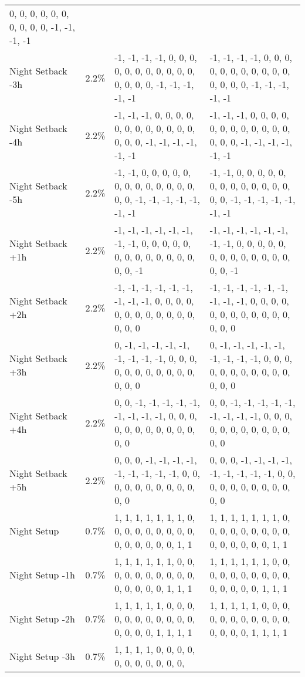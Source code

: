 \begin{longtable}[]{@{}llll@{}}
0, 0, 0, 0, 0, 0, 0, 0, 0, 0, -1, -1, -1, -1 \\
Night Setback -3h & 2.2\% & -1, -1, -1, -1, 0, 0, 0, 0, 0, 0, 0, 0, 0,
0, 0, 0, 0, 0, 0, -1, -1, -1, -1, -1 & -1, -1, -1, -1, 0, 0, 0, 0, 0, 0,
0, 0, 0, 0, 0, 0, 0, 0, 0, -1, -1, -1, -1, -1 \\
Night Setback -4h & 2.2\% & -1, -1, -1, 0, 0, 0, 0, 0, 0, 0, 0, 0, 0, 0,
0, 0, 0, 0, -1, -1, -1, -1, -1, -1 & -1, -1, -1, 0, 0, 0, 0, 0, 0, 0, 0,
0, 0, 0, 0, 0, 0, 0, -1, -1, -1, -1, -1, -1 \\
Night Setback -5h & 2.2\% & -1, -1, 0, 0, 0, 0, 0, 0, 0, 0, 0, 0, 0, 0,
0, 0, 0, -1, -1, -1, -1, -1, -1, -1 & -1, -1, 0, 0, 0, 0, 0, 0, 0, 0, 0,
0, 0, 0, 0, 0, 0, -1, -1, -1, -1, -1, -1, -1 \\
Night Setback +1h & 2.2\% & -1, -1, -1, -1, -1, -1, -1, -1, 0, 0, 0, 0,
0, 0, 0, 0, 0, 0, 0, 0, 0, 0, 0, -1 & -1, -1, -1, -1, -1, -1, -1, -1, 0,
0, 0, 0, 0, 0, 0, 0, 0, 0, 0, 0, 0, 0, 0, -1 \\
Night Setback +2h & 2.2\% & -1, -1, -1, -1, -1, -1, -1, -1, -1, 0, 0, 0,
0, 0, 0, 0, 0, 0, 0, 0, 0, 0, 0, 0 & -1, -1, -1, -1, -1, -1, -1, -1, -1,
0, 0, 0, 0, 0, 0, 0, 0, 0, 0, 0, 0, 0, 0, 0 \\
Night Setback +3h & 2.2\% & 0, -1, -1, -1, -1, -1, -1, -1, -1, -1, 0, 0,
0, 0, 0, 0, 0, 0, 0, 0, 0, 0, 0, 0 & 0, -1, -1, -1, -1, -1, -1, -1, -1,
-1, 0, 0, 0, 0, 0, 0, 0, 0, 0, 0, 0, 0, 0, 0 \\
Night Setback +4h & 2.2\% & 0, 0, -1, -1, -1, -1, -1, -1, -1, -1, -1, 0,
0, 0, 0, 0, 0, 0, 0, 0, 0, 0, 0, 0 & 0, 0, -1, -1, -1, -1, -1, -1, -1,
-1, -1, 0, 0, 0, 0, 0, 0, 0, 0, 0, 0, 0, 0, 0 \\
Night Setback +5h & 2.2\% & 0, 0, 0, -1, -1, -1, -1, -1, -1, -1, -1, -1,
0, 0, 0, 0, 0, 0, 0, 0, 0, 0, 0, 0 & 0, 0, 0, -1, -1, -1, -1, -1, -1,
-1, -1, -1, 0, 0, 0, 0, 0, 0, 0, 0, 0, 0, 0, 0 \\
Night Setup & 0.7\% & 1, 1, 1, 1, 1, 1, 1, 0, 0, 0, 0, 0, 0, 0, 0, 0, 0,
0, 0, 0, 0, 0, 1, 1 & 1, 1, 1, 1, 1, 1, 1, 0, 0, 0, 0, 0, 0, 0, 0, 0, 0,
0, 0, 0, 0, 0, 1, 1 \\
Night Setup -1h & 0.7\% & 1, 1, 1, 1, 1, 1, 0, 0, 0, 0, 0, 0, 0, 0, 0,
0, 0, 0, 0, 0, 0, 1, 1, 1 & 1, 1, 1, 1, 1, 1, 0, 0, 0, 0, 0, 0, 0, 0, 0,
0, 0, 0, 0, 0, 0, 1, 1, 1 \\
Night Setup -2h & 0.7\% & 1, 1, 1, 1, 1, 0, 0, 0, 0, 0, 0, 0, 0, 0, 0,
0, 0, 0, 0, 0, 1, 1, 1, 1 & 1, 1, 1, 1, 1, 0, 0, 0, 0, 0, 0, 0, 0, 0, 0,
0, 0, 0, 0, 0, 1, 1, 1, 1 \\
Night Setup -3h & 0.7\% & 1, 1, 1, 1, 0, 0, 0, 0, 0, 0, 0, 0, 0, 0, 0,

\end{longtable}
